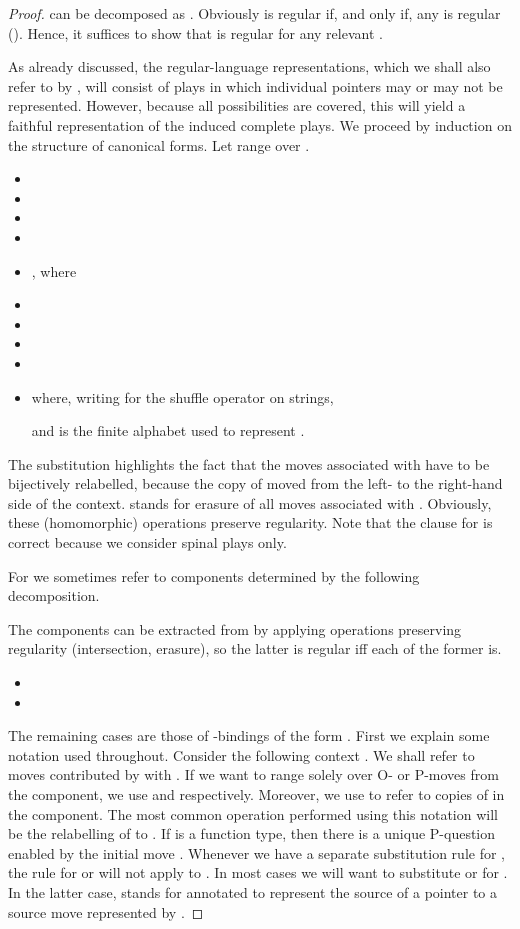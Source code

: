 \documentclass{CSML}
\theoremstyle{definition}\newtheorem{definition}[thm]{Definition}
\theoremstyle{definition}\newtheorem{example}[thm]{Example}
\theoremstyle{definition}\newtheorem{proposition}[thm]{Proposition}
\theoremstyle{definition}\newtheorem{lemma}[thm]{Lemma}
\theoremstyle{definition}\newtheorem{theorem}[thm]{Theorem}
\theoremstyle{definition}\newtheorem{corollary}[thm]{Corollary}
\theoremstyle{definition}\newtheorem{remark}[thm]{Remark}
\newcommand\nt[1]{#1}
\begin{document}
\begin{proof}
 can be decomposed as . Obviously 
is regular if, and only if, any  is regular (). Hence, it suffices to show
that  is regular for any relevant .

As already discussed, the regular-language representations, which we shall also refer to by ,
will consist of plays in which individual pointers may or may not be represented. However, because all possibilities are covered, 
this will yield a faithful representation of the induced complete plays.
We proceed by induction on the structure of canonical forms. Let  range over . 
\begin{itemize}
\item 
\item 
\item 
\item 
\item , 
where 
\item 
\item 
\item 

\item 

\item  where, \nt{writing  for the shuffle operator on strings,} 

and  is the finite alphabet used to represent .
\end{itemize}
The substitution  highlights the fact that the moves associated with  have to be bijectively relabelled, because
the copy of  moved from the left- to the right-hand side of the context.
 stands for erasure of all moves associated with . Obviously, these (homomorphic) operations preserve regularity. 
Note that the clause for  is correct because we consider spinal plays only.

For  we sometimes refer
to components determined by the following decomposition.

The components  can be extracted from 
by applying operations preserving regularity (intersection, erasure), so the latter is regular iff each of the former is.
\begin{itemize}
\item 
\item 
\end{itemize}


The remaining cases are those of -bindings of the form .
First we explain some notation used throughout.
Consider the following context .
We shall refer to moves contributed by  with .
If we want to range solely over O- or P-moves from the component, we use  and  respectively.
Moreover, we use  to refer to copies of  in the  component.
The most common operation performed using this notation will be the relabelling of  to .
If  is a function type, then there is a unique P-question  enabled by the initial move .
Whenever we have a separate substitution rule for , the rule for  or  will not apply to .
In most cases we will want to substitute  or  for . In the latter case,  stands for 
annotated to represent the source of a pointer to a source move represented by .


\end{proof}
\end{document}
